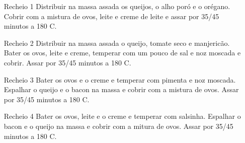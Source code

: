 {	\begin{itemize}
		\item[Recheio 1] Distribuir na massa assada os queijos, o alho poró e o
		      orégano. Cobrir com a mistura de ovos, leite e creme de leite e assar por
		      35/45 minutos a 180\grau{} C.
		\item[Recheio 2] Distribuir na massa assada o queijo, tomate seco e
		      manjericão. Bater os ovos, leite e creme, temperar com um pouco de sal e noz
		      moscada e cobrir. Assar por 35/45 minutos a 180\grau{} C.
		\item[Recheio 3] Bater os ovos e o creme e temperar com pimenta e noz moscada.
		      Espalhar o queijo e o bacon na massa e cobrir com a mistura de ovos. Assar
		      por 35/45 minutos a 180\grau{} C.
		\item[Recheio 4] Bater os ovos, leite e o creme e temperar com salsinha.
		      Espalhar o bacon e o queijo na massa e cobrir com a mitura de ovos. Assar
		      por 35/45 minutos a 180\grau{} C.
	\end{itemize}
}

